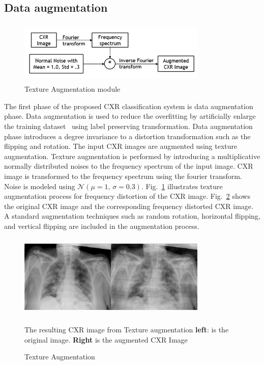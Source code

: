 \subsection{Data augmentation}

\begin{center}
    \begin{figure}[htbp]
    \centerline{\includegraphics[height=30mm,width=9cm]{Figures/TexAug.PNG}}
    \caption{Texture Augmentation module}
    \label{texaug}
    \end{figure}
    \end{center}
The first phase of the proposed CXR classification system is data augmentation phase. Data augmentation is used to reduce the overfitting by artificially enlarge the training dataset~\cite{krizhevsky2012imagenet} using label preserving transformation. Data augmentation phase introduces a degree invariance to a distortion transformation such as the flipping and rotation. The input CXR images are augmented using texture augmentation.  Texture augmentation is performed by introducing a multiplicative normally distributed noises to the frequency spectrum of the input image. CXR image is transformed to the frequency spectrum using the fourier transform.  Noise is modeled using $\mathcal{N}(\mu = 1,\,\sigma = 0.3)$. Fig.~\ref{texaug} illustrates texture augmentation process for frequency distortion of the CXR image. Fig.~\ref{resltaug} shows the original CXR image and the corresponding frequency distorted CXR image. A standard augmentation techniques such as random rotation, horizontal flipping, and vertical flipping are included in the augmentation process. 

\begin{center}
    \begin{figure}[htbp]
    \centerline{\includegraphics[height=40mm,width=9cm]{Figures/freqJitt.png}}
    \caption{Texture Augmentation}{The resulting CXR image from Texture augmentation \textbf{left}: is the original image. \textbf{Right} is the augmented  CXR Image}
    \label{resltaug}
    \end{figure}
    \end{center} 
    

